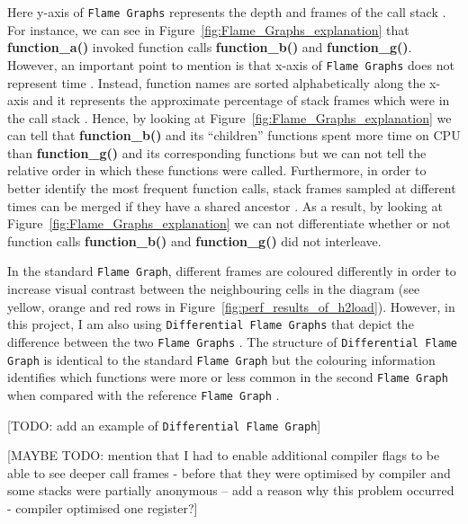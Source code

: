 \documentclass[12pt,a4paper,twoside,openright]{report}
\begin{document}
Here y-axis of \texttt{Flame Graphs} represents the depth and frames of the call stack \cite{CPU_Flame_graphs}.
For instance, we can see in Figure~\ref{fig:Flame_Graphs_explanation} that \textbf{function\_a()} invoked function calls \textbf{function\_b()} and \textbf{function\_g()}. 
However, an important point to mention is that x-axis of \texttt{Flame Graphs} does not represent time \cite{CPU_Flame_graphs}.
Instead, function names are sorted alphabetically along the x-axis and it represents the approximate percentage of stack frames which were in the call stack \cite{CPU_Flame_graphs}.
Hence, by looking at Figure~\ref{fig:Flame_Graphs_explanation} we can tell that \textbf{function\_b()} and its \enquote{children} functions spent more time on CPU than \textbf{function\_g()} and its corresponding functions but we can not tell the relative order in which these functions were called.
Furthermore, in order to better identify the most frequent function calls, stack frames sampled at different times can be merged if they have a shared ancestor \cite{CPU_Flame_graphs}.
As a result, by looking at Figure~\ref{fig:Flame_Graphs_explanation} we can not differentiate whether or not function calls \textbf{function\_b()} and \textbf{function\_g()} did not interleave.

In the standard \texttt{Flame Graph}, different frames are coloured differently in order to increase visual contrast between the neighbouring cells in the diagram \cite{CPU_Flame_graphs} (see yellow, orange and red rows in Figure~\ref{fig:perf_results_of_h2load}).
However, in this project, I am also using \texttt{Differential Flame Graphs} that depict the difference between the two \texttt{Flame Graphs} \cite{Differential_Flame_Graphs}.
The structure of \texttt{Differential Flame Graph} is identical to the standard \texttt{Flame Graph} but the colouring information identifies which functions were more or less common in the second \texttt{Flame Graph} when compared with the reference \texttt{Flame Graph} \cite{Differential_Flame_Graphs}.

[TODO: add an example of \texttt{Differential Flame Graph}]





[MAYBE TODO: mention that I had to enable additional compiler flags to be able to see deeper call frames - before that they were optimised by compiler and some stacks were partially anonymous  -- add a reason why this problem occurred - compiler optimised one register?]
\end{document}
